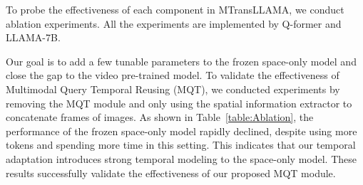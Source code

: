 \begin{table}[t]
\begin{center}
\caption{Ablation Study on the MUStARD and qaEgo4d datasets. To better observe the impact of the proposed method on the results, we conducted experiments on text and visual modalities. Experiments show our method is beneficial to the results. Best performance is highlighted in bold.}
\label{table:Ablation}
\end{center}
\end{table}



To probe the effectiveness of each component in MTransLLAMA, we conduct ablation experiments. All the experiments are implemented by Q-former and LLAMA-7B. 

Our goal is to add a few tunable parameters to the frozen space-only model and close the gap to the video pre-trained model. To validate the effectiveness of Multimodal Query Temporal Reusing (MQT), we conducted experiments by removing the MQT module and only using the spatial information extractor to concatenate frames of images. As shown in Table~\ref{table:Ablation}, the performance of the frozen space-only model rapidly declined, despite using more tokens and spending more time in this setting. This indicates that our temporal adaptation introduces strong temporal modeling to the space-only model. These results successfully validate the effectiveness of our proposed MQT module.


